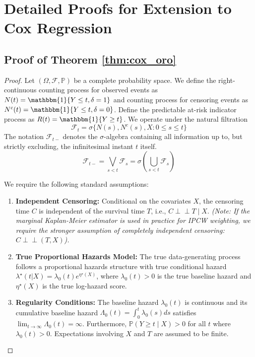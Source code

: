 \documentclass[11pt]{article}
\theoremstyle{plain}
\theoremstyle{plain}
\theoremstyle{plain}
\theoremstyle{plain}
\theoremstyle{plain}
\theoremstyle{plain}
\theoremstyle{plain}
\begin{document}
 

\section{Detailed Proofs for Extension to Cox Regression}
\label{app:cox_extension_proofs}


\subsection{Proof of Theorem \ref{thm:cox_oro}}

\begin{proof}

Let $(\Omega, \mathcal{F}, \mathbb{P})$ be a complete probability space.  We define the right-continuous counting process for observed events as 
$N(t) = \mathbbm{1}\{Y \le t, \delta=1\}$ and counting process for censoring events as $N^c(t) = \mathbbm{1}\{Y \le t, \delta = 0\}$. Define the predictable at-risk indicator process as $R(t) = \mathbbm{1}\{Y \ge t\}$. We operate under the natural filtration 
$$\mathcal{F}_{t} = \sigma \Big\{ N(s), N^c(s), X: 0 \le s \le t \Big\}$$ The notation $\mathcal{F}_{t-}$ denotes the $\sigma$-algebra containing all information up to, but strictly excluding, the infinitesimal instant $t$ itself. 
$$\mathcal{F}_{t-} = \bigvee_{s < t} \mathcal{F}_s = \sigma \left( \bigcup_{s < t} \mathcal{F}_s \right)$$

We require the following standard assumptions:
\begin{enumerate}[label=(\textbf{A\arabic*})]
    \item \textbf{Independent Censoring:} Conditional on the covariates $X$, the censoring time $C$ is independent of the survival time $T$, i.e., $C \perp\!\!\!\perp T \mid X$. \textit{(Note: If the marginal Kaplan-Meier estimator is used in practice for IPCW weighting, we require the stronger assumption of completely independent censoring: $C \perp\!\!\!\perp (T, X)$).}
    \item \textbf{True Proportional Hazards Model:} The true data-generating process follows a proportional hazards structure with true conditional hazard $\lambda^\star(t|X) = \lambda_0(t) e^{\eta^\star(X)}$, where $\lambda_0(t) > 0$ is the true baseline hazard and $\eta^\star(X)$ is the true log-hazard score.
    \item \textbf{Regularity Conditions:} The baseline hazard $\lambda_0(t)$ is continuous and its cumulative baseline hazard $\Lambda_0(t) = \int_0^t \lambda_0(s)ds$ satisfies $\lim_{t \to \infty} \Lambda_0(t) = \infty$. Furthermore, $\mathbb{P}(Y \ge t \mid X) > 0$ for all $t$ where $\lambda_0(t) > 0$. Expectations involving $X$ and $T$ are assumed to be finite.
\end{enumerate}


\end{proof}
\end{document}
